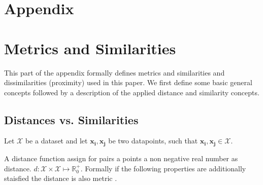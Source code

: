 \documentclass[12pt,a4paper,bibliography=totocnumbered,listof=totocnumbered]{scrartcl}
\begin{document}
{\pagebreak

\renewcommand\refname{List of Literature}






\pagebreak

\rhead{}
\setcounter{page}{1}

\begin{appendix}
	
\section*{Appendix}
{}

\section{Metrics and Similarities}

This part of the appendix formally defines metrics and similarities and dissimilarities (proximity) used in this paper. We first define some basic general concepts followed by a description of the applied distance and similarity concepts. 

\subsection{Distances vs. Similarities}

Let $\mathcal{X}$ be a dataset and let $\boldsymbol{x_i},\boldsymbol{x_j}$ be two datapoints, such that $\boldsymbol{x_i},\boldsymbol{x_j} \in \mathcal{X}$. 

A distance function assign for pairs a points a non negative real number as distance. $d:\mathcal{X}\times \mathcal{X} \mapsto \mathbb{R}_0^+$. Formally if the following properties are additionally staisfied the distance is also metric \cite[page 28]{Shirali06a}.


\end{appendix}}
\end{document}
